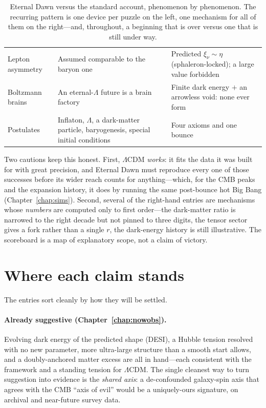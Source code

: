 \begin{table}[ht]
{\begin{tabular}{@{}p{}p{}p{}@{}}
    Lepton asymmetry & Assumed comparable to the baryon one & Predicted
      $\xi_\nu\sim\eta$ (sphaleron-locked); a large value forbidden \\
    Boltzmann brains & An eternal-$\Lambda$ future is a brain factory & Finite dark
      energy $+$ an arrowless void: none ever form \\
    Postulates & Inflaton, $\Lambda$, a dark-matter particle, baryogenesis, special
      initial conditions & Four axioms and one bounce \\
    \bottomrule
  \end{tabular}}
  \caption{Eternal Dawn versus the standard account, phenomenon by phenomenon. The
    recurring pattern is one device per puzzle on the left, one mechanism for all of
    them on the right---and, throughout, a beginning that is over versus one that is
    still under way.}
  \label{tab:scoreboard}
\end{table}

Two cautions keep this honest. First, $\Lambda$CDM \emph{works}: it fits the data
it was built for with great precision, and Eternal Dawn must reproduce every one of
those successes before its wider reach counts for anything---which, for the CMB
peaks and the expansion history, it does by running the same post-bounce hot Big
Bang (Chapter~\ref{chap:sims}). Second, several of the right-hand entries are
mechanisms whose \emph{numbers} are computed only to first order---the dark-matter
ratio is narrowed to the right decade but not pinned to three digits, the tensor
sector gives a fork rather than a single $r$, the dark-energy history is still
illustrative. The scoreboard is a map of explanatory scope, not a claim of victory.

\section{Where each claim stands}

The entries sort cleanly by how they will be settled.

\paragraph{Already suggestive (Chapter~\ref{chap:nowobs}).} Evolving dark energy of
the predicted shape (DESI), a Hubble tension resolved with no new parameter, more
ultra-large structure than a smooth start allows, and a doubly-anchored matter
excess are all in hand---each consistent with the framework and a standing tension
for $\Lambda$CDM. The single cleanest way to turn suggestion into evidence is the
\emph{shared axis}: a de-confounded galaxy-spin axis that agrees with the CMB
``axis of evil'' would be a uniquely-ours signature, on archival and near-future
survey data.


